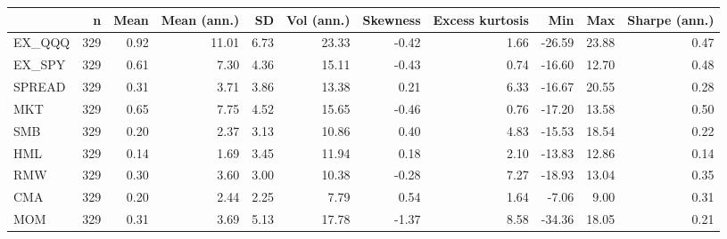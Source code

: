 \begin{tabular}{lrrrrrrrrrr}
\toprule
 & n & Mean & Mean (ann.) & SD & Vol (ann.) & Skewness & Excess kurtosis & Min & Max & Sharpe (ann.) \\
\midrule
EX\_QQQ & 329 & 0.92 & 11.01 & 6.73 & 23.33 & -0.42 & 1.66 & -26.59 & 23.88 & 0.47 \\
EX\_SPY & 329 & 0.61 & 7.30 & 4.36 & 15.11 & -0.43 & 0.74 & -16.60 & 12.70 & 0.48 \\
SPREAD & 329 & 0.31 & 3.71 & 3.86 & 13.38 & 0.21 & 6.33 & -16.67 & 20.55 & 0.28 \\
MKT & 329 & 0.65 & 7.75 & 4.52 & 15.65 & -0.46 & 0.76 & -17.20 & 13.58 & 0.50 \\
SMB & 329 & 0.20 & 2.37 & 3.13 & 10.86 & 0.40 & 4.83 & -15.53 & 18.54 & 0.22 \\
HML & 329 & 0.14 & 1.69 & 3.45 & 11.94 & 0.18 & 2.10 & -13.83 & 12.86 & 0.14 \\
RMW & 329 & 0.30 & 3.60 & 3.00 & 10.38 & -0.28 & 7.27 & -18.93 & 13.04 & 0.35 \\
CMA & 329 & 0.20 & 2.44 & 2.25 & 7.79 & 0.54 & 1.64 & -7.06 & 9.00 & 0.31 \\
MOM & 329 & 0.31 & 3.69 & 5.13 & 17.78 & -1.37 & 8.58 & -34.36 & 18.05 & 0.21 \\
\bottomrule
\end{tabular}

